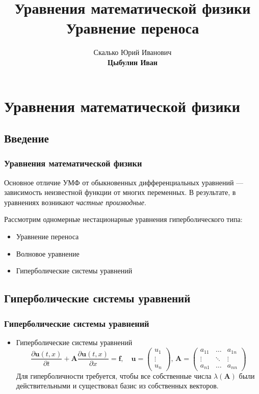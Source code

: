 \documentclass[professionalfonts,compress,unicode,aspectratio=169]{beamer}
\title[УМФ. Уравнение переноса]{Уравнения математической физики\\Уравнение переноса}
\author[Цыбулин И.В.]{Скалько Юрий Иванович\\
\textbf{Цыбулин Иван}}
\date{}
\begin{document}
\begin{frame}[plain]
\titlepage
\end{frame}

\section{Уравнения математической физики}

\subsection{Введение}
\begin{frame}\frametitle{Уравнения математической физики}
	Основное отличие УМФ от обыкновенных дифференциальных уравнений --- зависимость неизвестной функции
	от многих переменных. В результате, в уравнениях возникают \emph{частные производные}.
	
	Рассмотрим одномерные нестационарные уравнения гиперболического типа:
	\begin{itemize}
		\item Уравнение переноса
		\item Волновое уравнение
		\item Гиперболические системы уравнений
	\end{itemize}
\end{frame}

\subsection{Гиперболические системы уравнений}
\begin{frame}\frametitle{Гиперболические системы уравнений}
\begin{itemize}
	\item Гиперболические системы уравнений
	\[
		\frac{\partial \mathbf{u}(t,x)}{\partial t} + \mathbf{A}\frac{\partial \mathbf{u}(t,x)}{\partial x} = \mathbf{f}, \quad 
		\mathbf{u} = \begin{pmatrix}u_1\\\vdots\\u_n\end{pmatrix},\,
		\mathbf{A} = \begin{pmatrix}a_{11}&\dots&a_{1n}\\\vdots&\ddots&\vdots\\a_{n1}&\dots&a_{nn}\end{pmatrix}
	\]
	Для гиперболичности требуется, чтобы все собственные числа $\lambda(\mathbf{A})$ были действительными и существовал базис из собственных
	векторов.
\end{itemize}
\end{frame}
\end{document}
